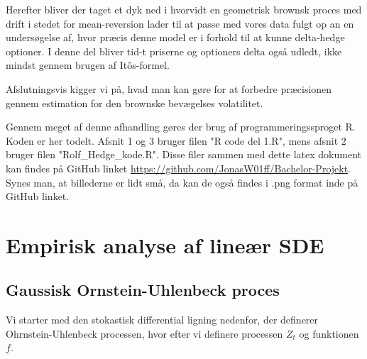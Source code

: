 \documentclass{article}
\theoremstyle{definition}
\theoremstyle{remark}
\begin{document}
Herefter bliver der taget et dyk ned i hvorvidt en geometrisk brownsk proces med drift i stedet for mean-reversion lader til at passe med vores data fulgt op an en undersøgelse af, hvor præcis denne model er i forhold til at kunne delta-hedge optioner. I denne del bliver tid-t priserne og optioners delta også udledt, ikke mindst gennem brugen af Itôs-formel.

Afslutningsvis kigger vi på, hvad man kan gøre for at forbedre præcisionen gennem estimation for den brownske bevægelses volatilitet.

Gennem meget af denne afhandling gøres der brug af programmeringssproget R. Koden er her todelt. Afsnit 1 og 3 bruger filen "R code del 1.R", mens afsnit 2 bruger filen "Rolf\_Hedge\_kode.R". Disse filer sammen med dette latex dokument kan findes på GitHub linket \href{https://github.com/JonasW01ff/Bachelor-Projekt}{https://github.com/JonasW01ff/Bachelor-Projekt}. Synes man, at billederne er lidt små, da kan de også findes i .png format inde på GitHub linket.
\newpage
\section{Empirisk analyse af lineær SDE}
\subsection{Gaussisk Ornstein-Uhlenbeck proces}
Vi starter med den stokastisk differential ligning nedenfor, der definerer Ohrnstein-Uhlenbeck processen, hvor efter vi definere processen $Z_t$ og funktionen $f$.
\end{document}
